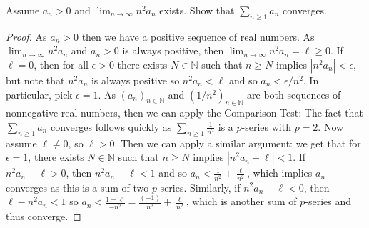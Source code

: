 \documentclass[oneside]{amsart}
\theoremstyle{definition}
\newcommand{\nn}{\mathbb N}
\begin{document}
\begin{tcolorbox}[colback=black!5!white,colframe=black!75!black,title= Exercise $4.2.$] Assume $a_n > 0$ and $\lim_{n \to \infty}n^2a_n$ exists. Show that $\sum_{n \geq 1} a_n$ converges.
\tcblower 
\begin{proof} As $a_n > 0$ then we have a positive sequence of real numbers. As $\lim_{n \to \infty} n^2a_n$ and $a_n > 0$ is always positive, then $\lim_{n \to \infty} n^2 a_n = \ell \geq 0$. If $\ell = 0$, then for all $\epsilon > 0$ there exists $N \in \nn$ such that $n \geq N$ implies $|n^2a_n|<\epsilon$, but note that $n^2a_n$ is always positive so $n^2a_n < \ell$ and so $a_n < \epsilon/n^2$. In particular, pick $\epsilon = 1$. As $(a_n)_{n\in \nn}$ and $(1/n^2)_{n \in \nn}$ are both sequences of nonnegative real numbers, then we can apply the Comparison Test: The fact that $\sum_{n \geq 1}a_n$ converges follows quickly as $\sum_{n \geq 1} \frac{1}{n^2}$ is a $p$-series with $p=2$. Now assume $\ell \neq 0$, so $\ell > 0$. Then we can apply a similar argument: we get that for $\epsilon = 1$, there exists $N \in \nn$ such that $ n \geq N$ implies $|n^2a_n - \ell | < 1$. If $n^2a_n-\ell >0$, then $n^2a_n-\ell < 1$ and so $ a_n < \frac{1}{n^2} + \frac{\ell}{n^2}$, which implies $a_n$ converges as this is a sum of two $p$-series. Similarly, if $n^2a_n - \ell < 0$, then $\ell - n^2a_n < 1$ so $a_n < \frac{1-\ell}{-n^2} = \frac{(-1)}{n^2} +\frac{\ell}{n^2}$, which is another sum of $p$-series and thus converge. 
\end{proof}
\end{tcolorbox}
\end{document}
